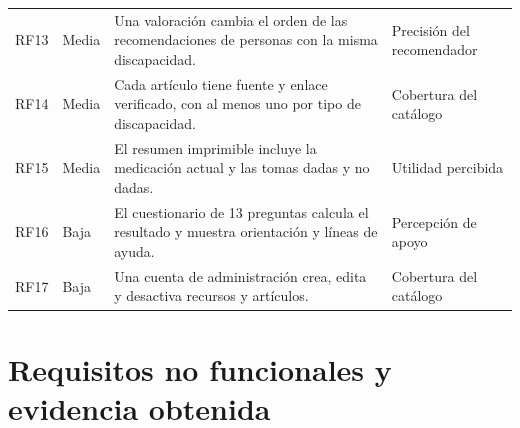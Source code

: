 {\begin{xltabular}{\textwidth}{l l >{\raggedright\arraybackslash}X >{\raggedright\arraybackslash}p{3.2cm}}
RF13 & Media & Una valoración cambia el orden de las recomendaciones de personas con la misma discapacidad. & Precisión del recomendador \\
RF14 & Media & Cada artículo tiene fuente y enlace verificado, con al menos uno por tipo de discapacidad. & Cobertura del catálogo \\
RF15 & Media & El resumen imprimible incluye la medicación actual y las tomas dadas y no dadas. & Utilidad percibida \\
RF16 & Baja & El cuestionario de 13 preguntas calcula el resultado y muestra orientación y líneas de ayuda. & Percepción de apoyo \\
RF17 & Baja & Una cuenta de administración crea, edita y desactiva recursos y artículos. & Cobertura del catálogo \\
\end{xltabular}
}

\section{Requisitos no funcionales y evidencia obtenida}

